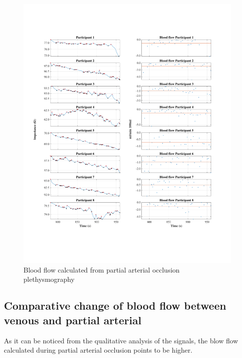 \begin{figure}
	\includegraphics[width=\textwidth,height=\textheight,keepaspectratio,trim={0.5cm 0.5cm 2cm 2cm},clip]{figure13}    
	\caption{Blood flow calculated from partial arterial occlusion plethysmography}
	\label{fig:blood_flow:arterial_occlusion}
\end{figure}

\subsection{Comparative change of blood flow between venous and partial arterial}
\label{section5.4.3}
As it can be noticed from the qualitative analysis of the signals, the blow flow calculated during partial arterial occlusion points to be higher. 

